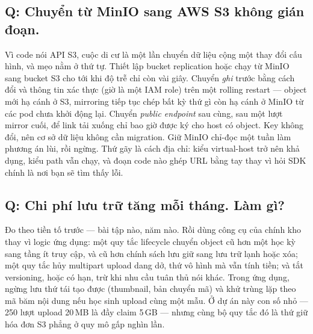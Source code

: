 \subsection*{Q: Chuyển từ MinIO sang AWS S3 không gián đoạn.}

Vì code nói API S3, cuộc di cư là một lần chuyển dữ liệu cộng một thay
đổi cấu hình, và mẹo nằm ở thứ tự. Thiết lập bucket replication hoặc
chạy  từ MinIO sang bucket S3 cho tới khi độ
trễ chỉ còn vài giây. Chuyển \emph{ghi} trước bằng cách đổi
 và thông tin xác thực (giờ là một IAM role)
trên một rolling restart --- object mới hạ cánh ở S3, mirroring tiếp
tục chép bất kỳ thứ gì còn hạ cánh ở MinIO từ các pod chưa khởi động
lại. Chuyển \emph{public endpoint} sau cùng, sau một lượt mirror cuối,
để link tải xuống chỉ bao giờ được ký cho host có object. Key không
đổi, nên cơ sở dữ liệu không cần migration. Giữ MinIO chỉ-đọc một tuần
làm phương án lùi, rồi ngừng. Thứ gãy là cách địa chỉ: kiểu virtual-host
trở nên khả dụng, kiểu path vẫn chạy, và đoạn code nào ghép URL bằng tay
thay vì hỏi SDK chính là nơi bạn sẽ tìm thấy lỗi.

\subsection*{Q: Chi phí lưu trữ tăng mỗi tháng. Làm gì?}

Đo theo tiền tố trước --- bài tập nào, năm nào. Rồi dùng công cụ của
chính kho thay vì logic ứng dụng: một quy tắc lifecycle chuyển object
cũ hơn một học kỳ sang tầng ít truy cập, và cũ hơn chính sách lưu giữ
sang lưu trữ lạnh hoặc xóa; một quy tắc hủy multipart upload dang dở,
thứ vô hình mà vẫn tính tiền; và tắt versioning, hoặc có hạn, trừ khi
nhu cầu tuân thủ nói khác. Trong ứng dụng, ngừng lưu thứ tái tạo được
(thumbnail, bản chuyển mã) và khử trùng lặp theo mã băm nội dung nếu
học sinh upload cùng một mẫu. Ở dự án này con số nhỏ --- 250 lượt
upload 20\,MB là đầy claim 5\,GB --- nhưng cùng bộ quy tắc đó là thứ
giữ hóa đơn S3 phẳng ở quy mô gấp nghìn lần.

